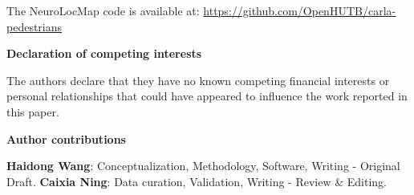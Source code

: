 \documentclass[preprint,12pt]{elsarticle}
\begin{document}
The NeuroLocMap code is available at: \url{https://github.com/OpenHUTB/carla-pedestrians}

\vspace{1em}
\noindent \textbf{Declaration of competing interests}
\vspace{0.5em}

The authors declare that they have no known competing financial interests or personal relationships that could have appeared to influence the work reported in this paper.

\vspace{1em}
\noindent \textbf{Author contributions}
\vspace{0.5em}

\textbf{Haidong Wang}: Conceptualization, Methodology, Software, Writing - Original Draft. \textbf{Caixia Ning}: Data curation, Validation, Writing - Review \& Editing.



\end{document}
